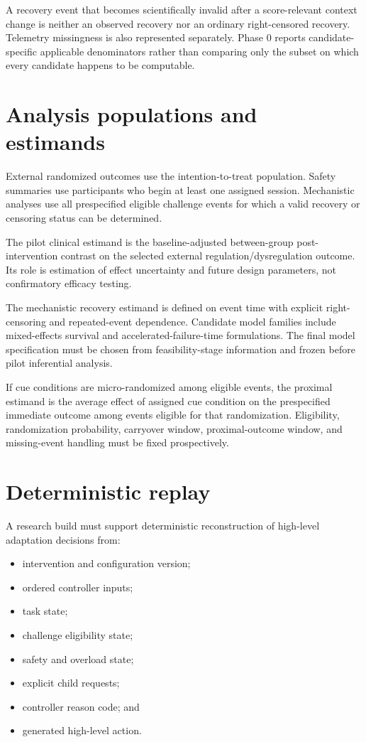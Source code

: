 \documentclass[man]{apa7}
\begin{document}
A recovery event that becomes scientifically invalid after a score-relevant context change is neither an observed recovery nor an ordinary right-censored recovery. Telemetry missingness is also represented separately. Phase 0 reports candidate-specific applicable denominators rather than comparing only the subset on which every candidate happens to be computable.

\section{Analysis populations and estimands}

External randomized outcomes use the intention-to-treat population. Safety summaries use participants who begin at least one assigned session. Mechanistic analyses use all prespecified eligible challenge events for which a valid recovery or censoring status can be determined.

The pilot clinical estimand is the baseline-adjusted between-group post-intervention contrast on the selected external regulation/dysregulation outcome. Its role is estimation of effect uncertainty and future design parameters, not confirmatory efficacy testing.

The mechanistic recovery estimand is defined on event time with explicit right-censoring and repeated-event dependence. Candidate model families include mixed-effects survival and accelerated-failure-time formulations. The final model specification must be chosen from feasibility-stage information and frozen before pilot inferential analysis.

If cue conditions are micro-randomized among eligible events, the proximal estimand is the average effect of assigned cue condition on the prespecified immediate outcome among events eligible for that randomization. Eligibility, randomization probability, carryover window, proximal-outcome window, and missing-event handling must be fixed prospectively.

\section{Deterministic replay}

A research build must support deterministic reconstruction of high-level adaptation decisions from:

\begin{itemize}
\item intervention and configuration version;
\item ordered controller inputs;
\item task state;
\item challenge eligibility state;
\item safety and overload state;
\item explicit child requests;
\item controller reason code; and
\item generated high-level action.
\end{itemize}
\end{document}
